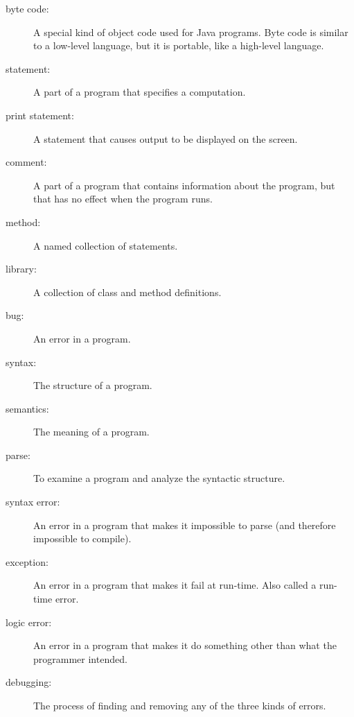 \documentclass[12pt]{book}
\theoremstyle{definition}
\begin{document}
\begin{description}
\item[byte code:]  A special kind of object code used for Java
programs.  Byte code is similar to a low-level language, but it is
portable, like a high-level language.

\item[statement:] A part of a program that specifies a computation.

\item[print statement:] A statement that causes output to be displayed
  on the screen.

\item[comment:] A part of a program that contains information
about the program, but that has no effect when the program runs.

\item[method:] A named collection of statements.

\item[library:] A collection of class and method definitions.

\item[bug:]  An error in a program.

\item[syntax:]  The structure of a program.

\item[semantics:]  The meaning of a program.

\item[parse:]  To examine a program and analyze the syntactic structure.

\item[syntax error:]  An error in a program that makes it impossible
to parse (and therefore impossible to compile).

\item[exception:]  An error in a program that makes it fail at
run-time.  Also called a run-time error.

\item[logic error:]  An error in a program that makes it do something
other than what the programmer intended.

\item[debugging:]  The process of finding and removing any of
the three kinds of errors.


\end{description}
\end{document}
